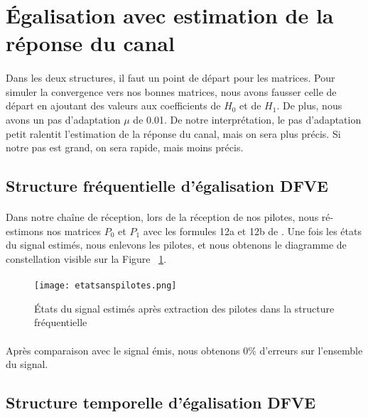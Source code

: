 \section{Égalisation avec estimation de la réponse du canal}

\paragraph{}
Dans les deux structures, il faut un point de départ pour les matrices. Pour
simuler la convergence vers nos bonnes matrices, nous avons fausser celle de
départ en ajoutant des valeurs aux coefficients de $H_0$ et de $H_1$. De plus,
nous avons un pas d'adaptation $\mu$ de 0.01. De notre interprétation, le pas
d'adaptation petit ralentit l'estimation de la réponse du canal, mais on sera
plus précis. Si notre pas est grand, on sera rapide, mais moins précis.

\subsection{Structure fréquentielle d'égalisation DFVE}
\paragraph{}
Dans notre chaîne de réception, lors de la réception de nos pilotes, nous
ré-estimons nos matrices $P_0$ et $P_1$ avec les formules 12a et 12b de
\cite{sujet}. Une fois les états du signal estimés, nous enlevons les pilotes,
et nous obtenons le diagramme de constellation visible sur la Figure
~\ref{etatsanspilote}.

\paragraph{}
\vspace{1\baselineskip}
\begin{figure}[!h]
  \centering
  \texttt{[image: etatsanspilotes.png]}
  \caption{États du signal estimés après extraction des pilotes dans la structure fréquentielle }
	\label{etatsanspilote}
\end{figure}

\paragraph{}
Après comparaison avec le signal émis, nous obtenons 0\% d'erreurs sur l'ensemble du signal.


\subsection{Structure temporelle d'égalisation DFVE}

